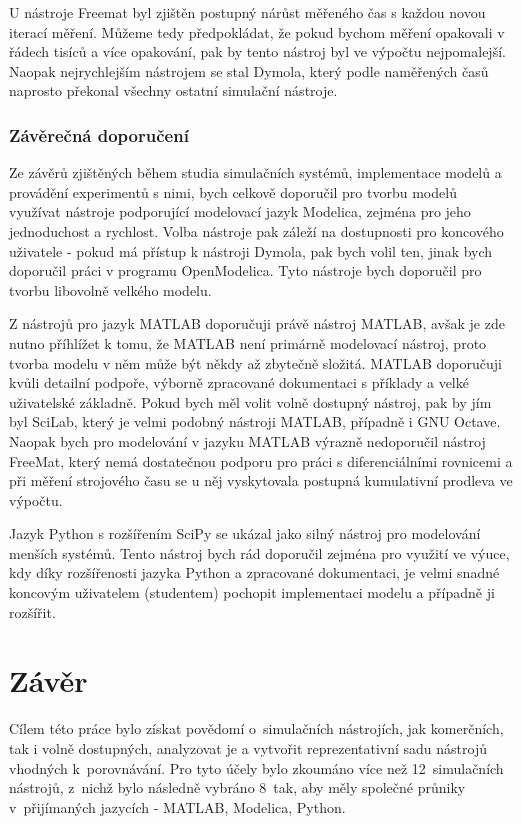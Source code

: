 U nástroje Freemat byl zjištěn postupný nárůst měřeného čas s každou novou iterací měření. Můžeme tedy předpokládat, že pokud bychom měření opakovali v řádech tisíců a více opakování, pak by tento nástroj byl ve výpočtu nejpomalejší. Naopak nejrychlejším nástrojem se stal Dymola, který podle naměřených časů naprosto překonal všechny ostatní simulační nástroje.
\subsection*{Závěrečná doporučení}

Ze závěrů zjištěných během studia simulačních systémů, implementace modelů a provádění experimentů s nimi, bych celkově doporučil pro tvorbu modelů využívat nástroje podporující modelovací jazyk Modelica, zejména pro jeho jednoduchost a rychlost. Volba nástroje pak záleží na dostupnosti pro koncového uživatele - pokud má přístup k nástroji Dymola, pak bych volil ten, jinak bych doporučil práci v programu OpenModelica. Tyto nástroje bych doporučil pro tvorbu libovolně velkého modelu.

Z nástrojů pro jazyk MATLAB doporučuji právě nástroj MATLAB, avšak je zde nutno příhlížet k tomu, že MATLAB není primárně modelovací nástroj, proto tvorba modelu v něm může být někdy až zbytečně složitá. MATLAB doporučuji kvůli detailní podpoře, výborně zpracované dokumentaci s příklady a velké uživatelské základně. Pokud bych měl volit volně dostupný nástroj, pak by jím byl SciLab, který je velmi podobný nástroji MATLAB, případně i GNU Octave. Naopak bych pro modelování v jazyku MATLAB výrazně nedoporučil nástroj FreeMat, který nemá dostatečnou podporu pro práci s diferenciálními rovnicemi a při měření strojového času se u něj vyskytovala postupná kumulativní prodleva ve výpočtu.

Jazyk Python s rozšířením SciPy se ukázal jako silný nástroj pro modelování menších systémů. Tento nástroj bych rád doporučil zejména pro využití ve výuce, kdy díky rozšířenosti jazyka Python a zpracované dokumentaci, je velmi snadné koncovým uživatelem (studentem) pochopit implementaci modelu a případně ji rozšířit.

\chapter{Závěr}
\label{kapitola6}

Cílem této práce bylo získat povědomí o~simulačních nástrojích, jak komerčních, tak i volně dostupných, analyzovat je a vytvořit reprezentativní sadu nástrojů vhodných k~porovnávání. Pro tyto účely bylo zkoumáno více než 12~simulačních nástrojů, z~nichž bylo následně vybráno 8~tak, aby měly společné průniky v~přijímaných jazycích - MATLAB, Modelica, Python.

